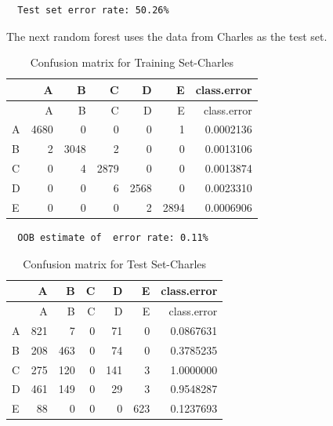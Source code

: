 \documentclass[12pt,twoside]{reedthesis}
\begin{document}
  \begin{verbatim}
  Test set error rate: 50.26%
  \end{verbatim}
  
  The next random forest uses the data from Charles as the test set.
  
  \begin{Shaded}
  \begin{Highlighting}[]
  \NormalTok{(}\NormalTok{)}
  
  \StringTok{ }\NormalTok{wl2[wl2$user_name ==}\StringTok{ }\NormalTok{subjects[}\NormalTok{], ]}
  \StringTok{ }\NormalTok{wl2[wl2$user_name !=}\StringTok{ }\NormalTok{subjects[}\NormalTok{], ]}
  \StringTok{ }\NormalTok{(} \NormalTok{OtherSubs3[, }\NormalTok{:}\NormalTok{], } 
                                  \NormalTok{Sub3[, }\NormalTok{:}\NormalTok{], }
                                  
                                  \NormalTok{)}
  \end{Highlighting}
  \end{Shaded}
  
  \begin{longtable}[c]{@{}lrrrrrr@{}}
  \caption{Confusion matrix for Training Set-Charles}\tabularnewline
  \toprule
  & A & B & C & D & E & class.error\tabularnewline
  \midrule
  \endfirsthead
  \toprule
  & A & B & C & D & E & class.error\tabularnewline
  \midrule
  \endhead
  A & 4680 & 0 & 0 & 0 & 1 & 0.0002136\tabularnewline
  B & 2 & 3048 & 2 & 0 & 0 & 0.0013106\tabularnewline
  C & 0 & 4 & 2879 & 0 & 0 & 0.0013874\tabularnewline
  D & 0 & 0 & 6 & 2568 & 0 & 0.0023310\tabularnewline
  E & 0 & 0 & 0 & 2 & 2894 & 0.0006906\tabularnewline
  \bottomrule
  \end{longtable}
  
  \begin{verbatim}
  OOB estimate of  error rate: 0.11%
  \end{verbatim}
  
  \begin{longtable}[c]{@{}lrrrrrr@{}}
  \caption{Confusion matrix for Test Set-Charles}\tabularnewline
  \toprule
  & A & B & C & D & E & class.error\tabularnewline
  \midrule
  \endfirsthead
  \toprule
  & A & B & C & D & E & class.error\tabularnewline
  \midrule
  \endhead
  A & 821 & 7 & 0 & 71 & 0 & 0.0867631\tabularnewline
  B & 208 & 463 & 0 & 74 & 0 & 0.3785235\tabularnewline
  C & 275 & 120 & 0 & 141 & 3 & 1.0000000\tabularnewline
  D & 461 & 149 & 0 & 29 & 3 & 0.9548287\tabularnewline
  E & 88 & 0 & 0 & 0 & 623 & 0.1237693\tabularnewline
  \bottomrule
  \end{longtable}
  
\end{document}
